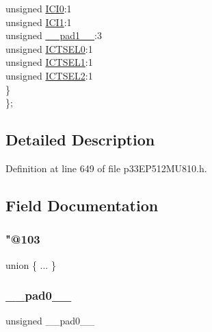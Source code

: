 \begin{DoxyCompactItemize}
\begin{tabbing}
\>\>unsigned \hyperlink{structtag_i_c3_c_o_n1_b_i_t_s_a6f1b5da2706b7c15fc8c9a01a30deaff}{ICI0}:1\\
\>\>unsigned \hyperlink{structtag_i_c3_c_o_n1_b_i_t_s_a7d5c777f0bc43f66f40462f79ed2179c}{ICI1}:1\\
\>\>unsigned \hyperlink{structtag_i_c3_c_o_n1_b_i_t_s_acaf2d0924a107ec6e8d2e31febaf66f9}{\_\_pad1\_\_}:3\\
\>\>unsigned \hyperlink{structtag_i_c3_c_o_n1_b_i_t_s_af6dd4d0e816b18462680d4b22fa926d3}{ICTSEL0}:1\\
\>\>unsigned \hyperlink{structtag_i_c3_c_o_n1_b_i_t_s_aa29140e739d886362537f87d199c4134}{ICTSEL1}:1\\
\>\>unsigned \hyperlink{structtag_i_c3_c_o_n1_b_i_t_s_a47d80892d449e6edbd5ba2ba9ff06deb}{ICTSEL2}:1\\
\>\} \\
\}; \\

\end{tabbing}\end{DoxyCompactItemize}


\subsection{Detailed Description}


Definition at line 649 of file p33\+E\+P512\+M\+U810.\+h.



\subsection{Field Documentation}
\mbox{\label{structtag_i_c3_c_o_n1_b_i_t_s_a5cae61044c44b21aacc91e4e0273cff0}} 
\subsubsection{\texorpdfstring{"@103}{@103}}
{\footnotesize\ttfamily union \{ ... \} }

\mbox{\label{structtag_i_c3_c_o_n1_b_i_t_s_adf71f3d8410c1f1dbbc96680a92c49af}} 
\subsubsection{\texorpdfstring{\+\_\+\+\_\+pad0\+\_\+\+\_\+}{\_\_pad0\_\_}}
{\footnotesize\ttfamily unsigned \+\_\+\+\_\+pad0\+\_\+\+\_\+}



